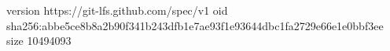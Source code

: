 version https://git-lfs.github.com/spec/v1
oid sha256:abbe5ce8b8a2b90f341b243dfb1e7ae93f1e93644dbc1fa2729e66e1e0bbf3ee
size 10494093
